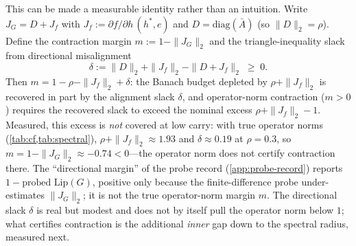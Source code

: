 \documentclass[11pt]{article}
\begin{document}
This can be made a measurable identity rather than an intuition. Write $J_G = D + J_f$ with $J_f := \partial f/\partial h\,(h^*, e)$ and $D = \text{diag}(\bar{A})$ (so $\|D\|_2 = \rho$). Define the contraction margin $m := 1 - \|J_G\|_2$ and the triangle-inequality slack from directional misalignment
\begin{equation}
\delta := \|D\|_2 + \|J_f\|_2 - \|D + J_f\|_2 \;\ge\; 0.
\end{equation}
Then $m = 1 - \rho - \|J_f\|_2 + \delta$: the Banach budget depleted by $\rho + \|J_f\|_2$ is recovered in part by the alignment slack $\delta$, and operator-norm contraction ($m > 0$) requires the recovered slack to exceed the nominal excess $\rho + \|J_f\|_2 - 1$. Measured, this excess is \emph{not} covered at low carry: with true operator norms (\cref{tab:cf,tab:spectral}), $\rho + \|J_f\|_2 \approx 1.93$ and $\delta \approx 0.19$ at $\rho = 0.3$, so $m = 1 - \|J_G\|_2 \approx -0.74 < 0$---the operator norm does not certify contraction there. The ``directional margin'' of the probe record (\cref{app:probe-record}) reports $1 - \text{probed Lip}(G)$, positive only because the finite-difference probe under-estimates $\|J_G\|_2$; it is not the true operator-norm margin $m$. The directional slack $\delta$ is real but modest and does not by itself pull the operator norm below $1$; what certifies contraction is the additional \emph{inner} gap down to the spectral radius, measured next.
\end{document}
